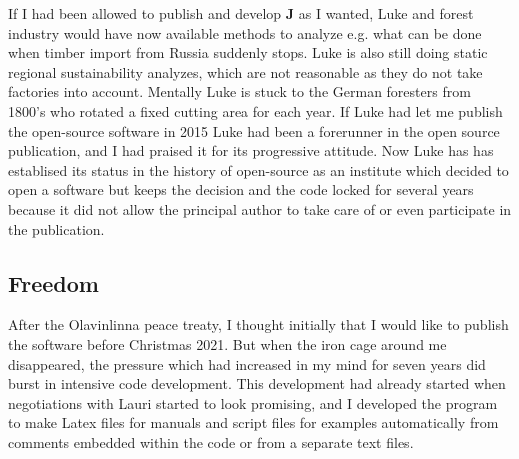 If I had been allowed to publish and develop \textbf{J} as I wanted,
Luke and forest industry would have
now available methods to analyze e.g. what can be done
when timber import from Russia suddenly stops.
Luke is also still doing static regional sustainability analyzes,
which are not reasonable
as they do not take factories into account. Mentally Luke
is stuck to the German foresters from
1800's who rotated a fixed cutting area for each year.
If Luke had let me publish the open-source software in 2015
Luke had been a forerunner in the open source publication, and I had praised it
for its progressive attitude. Now Luke has
has establised its status in the history of open-source as an institute which
decided to open a software
but keeps the decision and the code locked for several years because
it did not allow the principal
author to take care of or even participate in the publication.
\subsection{Freedom}
\label{preface9}
After the Olavinlinna peace treaty, I thought initially that
I would like to publish the software before Christmas 2021.
But when the iron cage around me disappeared, the pressure which had increased
in my mind for seven years did burst in intensive code development.
This development had already started when negotiations with Lauri started to look promising,
and I developed the program to make Latex files for manuals and script files
for examples automatically from comments embedded within the code or from a
separate text files.

